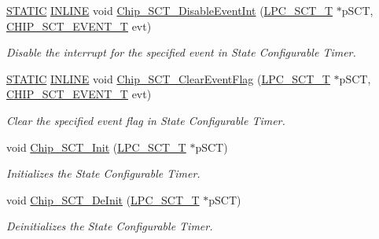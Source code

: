\begin{DoxyCompactItemize}
\hyperlink{group___l_p_c___types___public___macros_ga10b2d890d871e1489bb02b7e70d9bdfb}{S\+T\+A\+T\+IC} \hyperlink{spifi__18xx__43xx_8h_a2eb6f9e0395b47b8d5e3eeae4fe0c116}{I\+N\+L\+I\+NE} void \hyperlink{group___s_c_t__18_x_x__43_x_x_ga65197d6d801497e841d396347d164a43}{Chip\+\_\+\+S\+C\+T\+\_\+\+Disable\+Event\+Int} (\hyperlink{struct_l_p_c___s_c_t___t}{L\+P\+C\+\_\+\+S\+C\+T\+\_\+T} $\ast$p\+S\+CT, \hyperlink{group___s_c_t__18_x_x__43_x_x_ga9c76365e19f53e676f05cb7ccec143f7}{C\+H\+I\+P\+\_\+\+S\+C\+T\+\_\+\+E\+V\+E\+N\+T\+\_\+T} evt)
\begin{DoxyCompactList}\small\item\em Disable the interrupt for the specified event in State Configurable Timer. \end{DoxyCompactList}\item 
\hyperlink{group___l_p_c___types___public___macros_ga10b2d890d871e1489bb02b7e70d9bdfb}{S\+T\+A\+T\+IC} \hyperlink{spifi__18xx__43xx_8h_a2eb6f9e0395b47b8d5e3eeae4fe0c116}{I\+N\+L\+I\+NE} void \hyperlink{group___s_c_t__18_x_x__43_x_x_gaf0b410c164469e503d4f590aae33b916}{Chip\+\_\+\+S\+C\+T\+\_\+\+Clear\+Event\+Flag} (\hyperlink{struct_l_p_c___s_c_t___t}{L\+P\+C\+\_\+\+S\+C\+T\+\_\+T} $\ast$p\+S\+CT, \hyperlink{group___s_c_t__18_x_x__43_x_x_ga9c76365e19f53e676f05cb7ccec143f7}{C\+H\+I\+P\+\_\+\+S\+C\+T\+\_\+\+E\+V\+E\+N\+T\+\_\+T} evt)
\begin{DoxyCompactList}\small\item\em Clear the specified event flag in State Configurable Timer. \end{DoxyCompactList}\item 
void \hyperlink{group___s_c_t__18_x_x__43_x_x_ga5252a235f465943fb91cdf66e4dac3cf}{Chip\+\_\+\+S\+C\+T\+\_\+\+Init} (\hyperlink{struct_l_p_c___s_c_t___t}{L\+P\+C\+\_\+\+S\+C\+T\+\_\+T} $\ast$p\+S\+CT)
\begin{DoxyCompactList}\small\item\em Initializes the State Configurable Timer. \end{DoxyCompactList}\item 
void \hyperlink{group___s_c_t__18_x_x__43_x_x_ga897eccef4d23cde49d31e43d48715b1e}{Chip\+\_\+\+S\+C\+T\+\_\+\+De\+Init} (\hyperlink{struct_l_p_c___s_c_t___t}{L\+P\+C\+\_\+\+S\+C\+T\+\_\+T} $\ast$p\+S\+CT)
\begin{DoxyCompactList}\small\item\em Deinitializes the State Configurable Timer. \end{DoxyCompactList}\end{DoxyCompactItemize}


